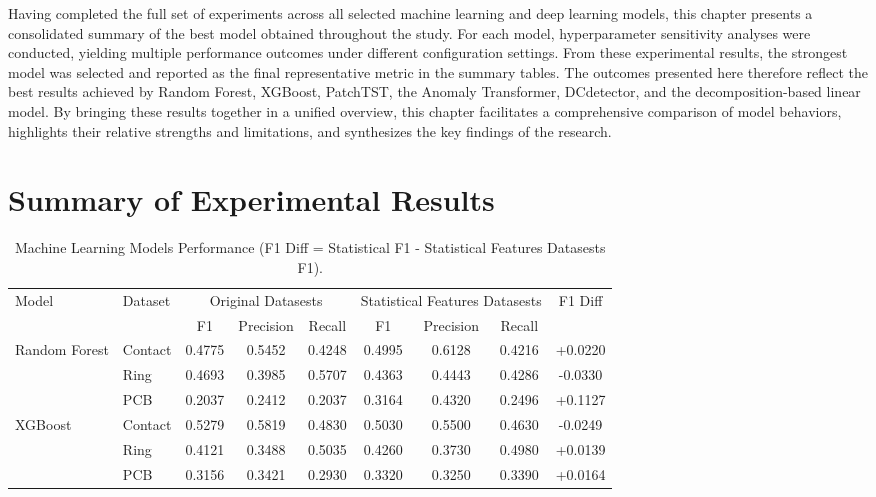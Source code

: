 Having completed the full set of experiments across all selected machine learning and deep learning models, this chapter presents a consolidated summary of the best model obtained throughout the study. For each model, hyperparameter sensitivity analyses were conducted, yielding multiple performance outcomes under different configuration settings. From these experimental results, the strongest model was selected and reported as the final representative metric in the summary tables. The outcomes presented here therefore reflect the best results achieved by Random Forest, XGBoost, PatchTST, the Anomaly Transformer, DCdetector, and the decomposition-based linear model. By bringing these results together in a unified overview, this chapter facilitates a comprehensive comparison of model behaviors, highlights their relative strengths and limitations, and synthesizes the key findings of the research.


\section{Summary of Experimental Results}


\begin{table}[htbp]
    \centering
    \caption{Machine Learning Models Performance (F1 Diff = Statistical F1 - Statistical Features Datasests F1).}
    \begin{tabular}{l|l|ccc|ccc|c}
        \hline
        \multirow{2}{*}{Model} & \multirow{2}{*}{Dataset} & \multicolumn{3}{c|}{Original Datasests} & \multicolumn{3}{c|}{Statistical Features Datasests} & \multirow{2}{*}{F1 Diff} \\
        \cline{3-8}
        & & F1 & Precision & Recall & F1 & Precision & Recall & \\
        \hline
        \multirow{3}{*}{Random Forest} & Contact & 0.4775 & 0.5452 & 0.4248 & 0.4995 & 0.6128 & 0.4216 & +0.0220 \\
                                       & Ring    & 0.4693 & 0.3985 & 0.5707 & 0.4363 & 0.4443 & 0.4286 & -0.0330 \\
                                       & PCB     & 0.2037 & 0.2412 & 0.2037 & 0.3164 & 0.4320 & 0.2496 & +0.1127 \\
        \hline
        \multirow{3}{*}{XGBoost} & Contact & 0.5279 & 0.5819 & 0.4830 & 0.5030 & 0.5500 & 0.4630 & -0.0249 \\
                                 & Ring    & 0.4121 & 0.3488 & 0.5035 & 0.4260 & 0.3730 & 0.4980 & +0.0139 \\
                                 & PCB     & 0.3156 & 0.3421 & 0.2930 & 0.3320 & 0.3250 & 0.3390 & +0.0164 \\
        \hline
    \end{tabular}
    \label{tab:ml_performance}
\end{table}

